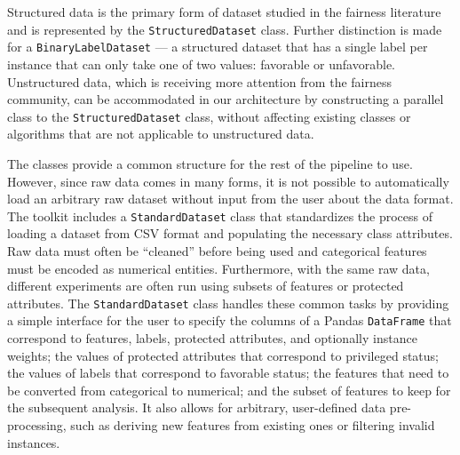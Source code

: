 \documentclass{article}
\begin{document}
Structured data is the primary form of dataset studied in the fairness literature and is represented by the \texttt{StructuredDataset} class. Further distinction is made for a \texttt{BinaryLabelDataset} --- a structured dataset that has a single label per instance that can only take one of two values: favorable or unfavorable.
Unstructured data, which is receiving more attention from the fairness community, 
can be accommodated in our architecture by constructing a 
parallel class to the \texttt{StructuredDataset} class, without affecting existing classes or algorithms that are not applicable to unstructured data.

The classes provide a common structure for the rest of the pipeline to use.  However, since raw data comes in many forms, it is not possible to automatically load an arbitrary raw dataset without input from the user about the data format. The toolkit includes a \texttt{StandardDataset} class that standardizes the process of loading a dataset from CSV format and populating the necessary class attributes. Raw data must often be ``cleaned'' before being used and categorical features must be encoded as numerical entities. Furthermore, with the same raw data, different experiments are often run using subsets of features or protected attributes. The \texttt{StandardDataset} class handles these common tasks by providing a simple interface for the user to specify the columns of a Pandas \texttt{DataFrame} that correspond to features, labels, protected attributes, and optionally instance weights; the values of protected attributes that correspond to privileged status; the values of labels that correspond to favorable status; the features that need to be converted from categorical to numerical; and the subset of features to keep for the subsequent analysis.
It also allows for arbitrary, user-defined data pre-processing, such as deriving new features from existing ones or filtering invalid instances.
\end{document}
